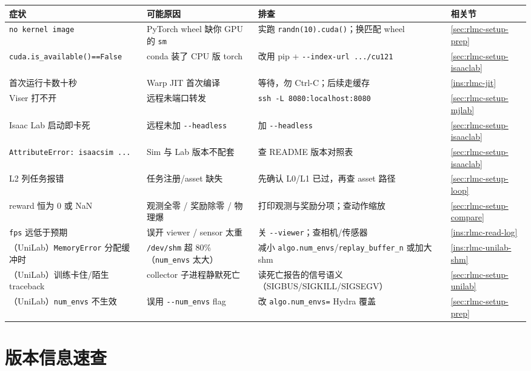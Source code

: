 \begin{center}
\small
\begin{tabular}{@{}p{4.0cm}p{3.2cm}p{3.4cm}p{2.0cm}@{}}
\toprule
症状 & 可能原因 & 排查 & 相关节 \\
\midrule
\verb|no kernel image| & PyTorch wheel 缺你 GPU 的 \texttt{sm} & 实跑 \verb|randn(10).cuda()|；换匹配 wheel & \cref{sec:rlmc-setup-prep} \\
\verb|cuda.is_available()==False| & conda 装了 CPU 版 torch & 改用 pip + \verb|--index-url .../cu121| & \cref{sec:rlmc-setup-isaaclab} \\
首次运行卡数十秒 & Warp JIT 首次编译 & 等待，勿 Ctrl-C；后续走缓存 & \cref{ins:rlmc-jit} \\
Viser 打不开 & 远程未端口转发 & \verb|ssh -L 8080:localhost:8080| & \cref{sec:rlmc-setup-mjlab} \\
Isaac Lab 启动即卡死 & 远程未加 \verb|--headless| & 加 \verb|--headless| & \cref{sec:rlmc-setup-isaaclab} \\
\verb|AttributeError: isaacsim ...| & Sim 与 Lab 版本不配套 & 查 README 版本对照表 & \cref{sec:rlmc-setup-isaaclab} \\
L2 列任务报错 & 任务注册/asset 缺失 & 先确认 L0/L1 已过，再查 asset 路径 & \cref{sec:rlmc-setup-loop} \\
reward 恒为 0 或 NaN & 观测全零 / 奖励除零 / 物理爆 & 打印观测与奖励分项；查动作缩放 & \cref{sec:rlmc-setup-compare} \\
\verb|fps| 远低于预期 & 误开 viewer / sensor 太重 & 关 \verb|--viewer|；查相机/传感器 & \cref{ins:rlmc-read-log} \\
（UniLab）\verb|MemoryError| 分配缓冲时 & \verb|/dev/shm| 超 80\%（\verb|num_envs| 太大） & 减小 \verb|algo.num_envs|/\verb|replay_buffer_n| 或加大 shm & \cref{ins:rlmc-unilab-shm} \\
（UniLab）训练卡住/陌生 traceback & collector 子进程静默死亡 & 读死亡报告的信号语义（SIGBUS/SIGKILL/SIGSEGV）& \cref{sec:rlmc-setup-unilab} \\
（UniLab）\verb|num_envs| 不生效 & 误用 \verb|--num_envs| flag & 改 \verb|algo.num_envs=| Hydra 覆盖 & \cref{sec:rlmc-setup-prep} \\
\bottomrule
\end{tabular}
\end{center}

\section{版本信息速查}
\label{sec:rlmc-setup-versions}

